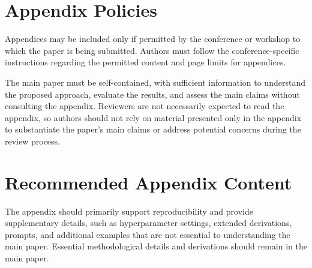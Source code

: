 \documentclass[9pt]{ieeeconf}
\begin{document}






\appendix

\section{Appendix Policies}
\label{sec:appendix_policies}

Appendices may be included only if permitted by the conference
or workshop to which the paper is being submitted. Authors must
follow the conference-specific instructions regarding the
permitted content and page limits for appendices.

The main paper must be self-contained, with sufficient information
to understand the proposed approach, evaluate the results, and
assess the main claims without consulting the appendix. Reviewers
are not necessarily expected to read the appendix, so authors
should not rely on material presented only in the appendix to
substantiate the paper's main claims or address potential concerns
during the review process.

\section{Recommended Appendix Content}
\label{sec:appendix_content}

The appendix should primarily support reproducibility and provide
supplementary details, such as hyperparameter settings, extended
derivations, prompts, and additional examples that are not
essential to understanding the main paper. Essential methodological
details and derivations should remain in the main paper.
\end{document}
